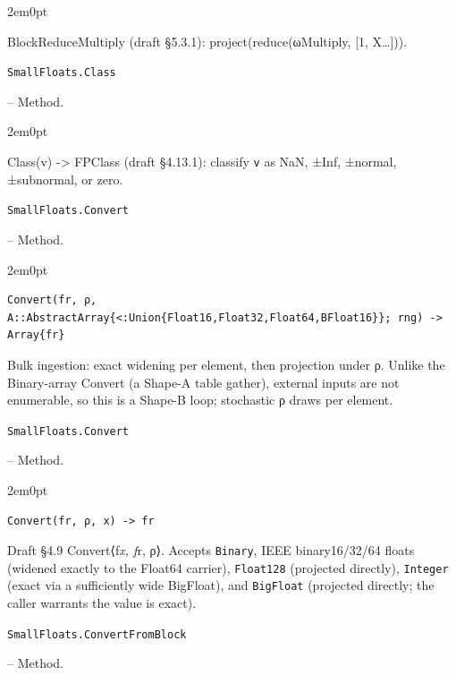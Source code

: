 \begin{adjustwidth}{2em}{0pt}

BlockReduceMultiply (draft §5.3.1): project(reduce(ωMultiply, [1, X…])).



\end{adjustwidth}
\hypertarget{11726654467661344946}{\texttt{SmallFloats.Class}}  -- {Method.}

\begin{adjustwidth}{2em}{0pt}

Class(v) -> FPClass (draft §4.13.1): classify \texttt{v} as NaN, ±Inf, ±normal, ±subnormal, or zero.



\end{adjustwidth}
\hypertarget{5403593118059835048}{\texttt{SmallFloats.Convert}}  -- {Method.}

\begin{adjustwidth}{2em}{0pt}


\begin{verbatim}
Convert(fr, ρ, A::AbstractArray{<:Union{Float16,Float32,Float64,BFloat16}}; rng) -> Array{fr}
\end{verbatim}

Bulk ingestion: exact widening per element, then projection under ρ. Unlike the Binary-array Convert (a Shape-A table gather), external inputs are not enumerable, so this is a Shape-B loop; stochastic ρ draws per element.



\end{adjustwidth}
\hypertarget{2402979922820933143}{\texttt{SmallFloats.Convert}}  -- {Method.}

\begin{adjustwidth}{2em}{0pt}


\begin{verbatim}
Convert(fr, ρ, x) -> fr
\end{verbatim}

Draft §4.9 Convert⟨f\emph{x, f}r, ρ⟩. Accepts \texttt{Binary}, IEEE binary16/32/64 floats (widened exactly to the Float64 carrier), \texttt{Float128} (projected directly), \texttt{Integer} (exact via a sufficiently wide BigFloat), and \texttt{BigFloat} (projected directly; the caller warrants the value is exact).



\end{adjustwidth}
\hypertarget{6528265372875072184}{\texttt{SmallFloats.ConvertFromBlock}}  -- {Method.}

